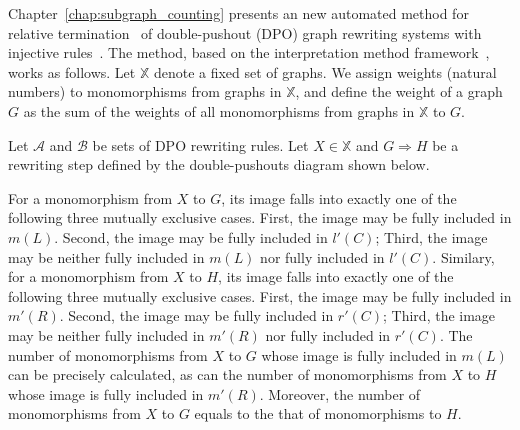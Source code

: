 

Chapter~\ref{chap:subgraph_counting} presents an new automated method for relative termination~\cite{geser1990relative} of double-pushout (DPO) graph rewriting systems with injective rules~\cite{corradini1997algebraic,habel2001double,konig2018atutorial}. The method, based on the interpretation method framework~\cite{nipkow1998term,contejean2005mechanically}, works as follows. Let \( \mathbb{X} \) denote a fixed set of graphs. We assign weights (natural numbers) to monomorphisms from graphs in \( \mathbb{X} \), and define the weight of a graph $G$ as the sum of the weights of all monomorphisms from graphs in \( \mathbb{X} \) to $G$. 

Let $\mathcal{A}$ and $\mathcal{B}$ be sets of DPO rewriting rules. Let $X \in \mathbb{X}$ and $G \Rightarrow H$ be a rewriting step defined by the double-pushouts diagram shown below. 
\begin{center}
    \end{center}

For a monomorphism from $X$ to $G$, its image falls into exactly one of the following three mutually exclusive cases. First, the image may be fully included in $m(L)$. Second, the image may be fully included in $l'(C)$; Third, the image may be neither fully included in $m(L)$ nor fully included in $l'(C)$. Similary, for a monomorphism from $X$ to $H$, its image falls into exactly one of the following three mutually exclusive cases. First, the image may be fully included in $m'(R)$. Second, the image may be fully included in $r'(C)$; Third, the image may be neither fully included in $m'(R)$ nor fully included in $r'(C)$. The number of monomorphisms from $X$ to $G$ whose image is fully included in $m(L)$ can be precisely calculated, as can the number of monomorphisms from $X$ to $H$ whose image is fully included in $m'(R)$. Moreover, the number of monomorphisms from $X$ to $G$ equals to the that of monomorphisms to $H$. 

